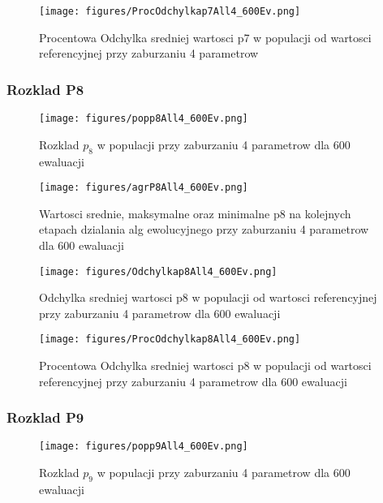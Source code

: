 \documentclass[]{article}
\begin{document}
\begin{figure}[htbp]
\centering
\texttt{[image: figures/ProcOdchylkap7All4\_600Ev.png]}
\caption{Procentowa Odchylka sredniej wartosci p7 w populacji od
wartosci referencyjnej przy zaburzaniu 4 parametrow}
\end{figure}

\newpage

\subsubsection{Rozklad P8}\label{rozklad-p8-1}

\begin{figure}[htbp]
\centering
\texttt{[image: figures/popp8All4\_600Ev.png]}
\caption{Rozklad \(p_8\) w populacji przy zaburzaniu 4 parametrow dla
600 ewaluacji}
\end{figure}

\begin{figure}[htbp]
\centering
\texttt{[image: figures/agrP8All4\_600Ev.png]}
\caption{Wartosci srednie, maksymalne oraz minimalne p8 na kolejnych
etapach dzialania alg ewolucyjnego przy zaburzaniu 4 parametrow dla 600
ewaluacji}
\end{figure}

\begin{figure}[htbp]
\centering
\texttt{[image: figures/Odchylkap8All4\_600Ev.png]}
\caption{Odchylka sredniej wartosci p8 w populacji od wartosci
referencyjnej przy zaburzaniu 4 parametrow dla 600 ewaluacji}
\end{figure}

\begin{figure}[htbp]
\centering
\texttt{[image: figures/ProcOdchylkap8All4\_600Ev.png]}
\caption{Procentowa Odchylka sredniej wartosci p8 w populacji od
wartosci referencyjnej przy zaburzaniu 4 parametrow dla 600 ewaluacji}
\end{figure}

\newpage

\subsubsection{Rozklad P9}\label{rozklad-p9-1}

\begin{figure}[htbp]
\centering
\texttt{[image: figures/popp9All4\_600Ev.png]}
\caption{Rozklad \(p_9\) w populacji przy zaburzaniu 4 parametrow dla
600 ewaluacji}
\end{figure}
\end{document}
